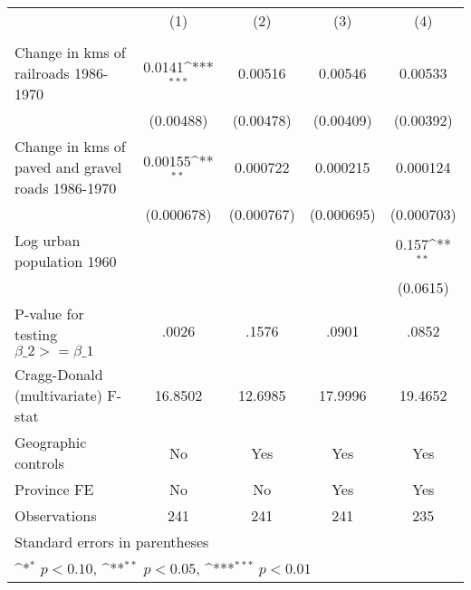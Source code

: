 {
\def\sym#1{\ifmmode^{#1}\else\(^{#1}\)\fi}
\begin{tabular}{l*{4}{c}}
\hline\hline
                &\multicolumn{1}{c}{(1)}&\multicolumn{1}{c}{(2)}&\multicolumn{1}{c}{(3)}&\multicolumn{1}{c}{(4)}\\
                &\multicolumn{1}{c}{}&\multicolumn{1}{c}{}&\multicolumn{1}{c}{}&\multicolumn{1}{c}{}\\
\hline
Change in kms of railroads 1986-1970&   0.0141\sym{***}&  0.00516         &  0.00546         &  0.00533         \\
                &(0.00488)         &(0.00478)         &(0.00409)         &(0.00392)         \\
[1em]
Change in kms of paved and gravel roads 1986-1970&  0.00155\sym{**} & 0.000722         & 0.000215         & 0.000124         \\
                &(0.000678)         &(0.000767)         &(0.000695)         &(0.000703)         \\
[1em]
Log urban population 1960&                  &                  &                  &    0.157\sym{**} \\
                &                  &                  &                  & (0.0615)         \\
\hline
P-value for testing $\beta\_{2} >= \beta\_{1}$&    .0026         &    .1576         &    .0901         &    .0852         \\
Cragg-Donald (multivariate) F-stat&  16.8502         &  12.6985         &  17.9996         &  19.4652         \\
Geographic controls&       No         &      Yes         &      Yes         &      Yes         \\
Province FE     &       No         &       No         &      Yes         &      Yes         \\
Observations    &      241         &      241         &      241         &      235         \\
\hline\hline
\multicolumn{5}{l}{\footnotesize Standard errors in parentheses}\\
\multicolumn{5}{l}{\footnotesize \sym{*} \(p<0.10\), \sym{**} \(p<0.05\), \sym{***} \(p<0.01\)}\\
\end{tabular}
}
